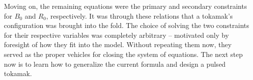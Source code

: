 \documentclass[11pt]{book}
\begin{document}
Moving on, the remaining equations were the primary and secondary constraints for $B_0$ and $R_0$, respectively. It was through these relations that a tokamak's configuration was brought into the fold. The choice of solving the two constraints for their respective variables was completely arbitrary -- motivated only by foresight of how they fit into the model. Without repeating them now, they served as the proper vehicles for closing the system of equations. The next step now is to learn how to generalize the current formula and design a pulsed tokamak.
\end{document}
